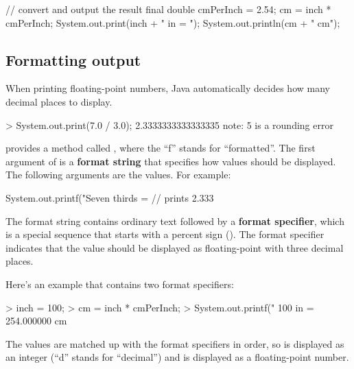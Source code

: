 \begin{code}
    // convert and output the result
    final double cmPerInch = 2.54;
    cm = inch * cmPerInch;
    System.out.print(inch + " in = ");
    System.out.println(cm + " cm");
\end{code}




\subsection{Formatting output}

When printing floating-point numbers, Java automatically decides how many decimal places to display.


\begin{code}
> System.out.print(7.0 / 3.0);
2.3333333333333335   note: 5 is a rounding error
\end{code}


 provides a method called , where the ``f'' stands for ``formatted''.  The first argument of  is a {\bf format string} that specifies how values should be displayed.
The following arguments are the values.
For example:

\begin{code}
    System.out.printf("Seven thirds = %
    // prints 2.333
\end{code}

The format string contains ordinary text followed by a {\bf format specifier}, which is a special sequence that starts with a percent sign (\java{\%}).
The format specifier  indicates that the value should be displayed as floating-point with three decimal places.

Here's an example that contains two format specifiers:

\begin{code}
> inch = 100;
> cm = inch * cmPerInch;
> System.out.printf("%
100 in = 254.000000 cm  
\end{code}

The values are matched up with the format specifiers in order, so 
is displayed as an integer (``d'' stands for ``decimal'') and
 is displayed as a floating-point number.

